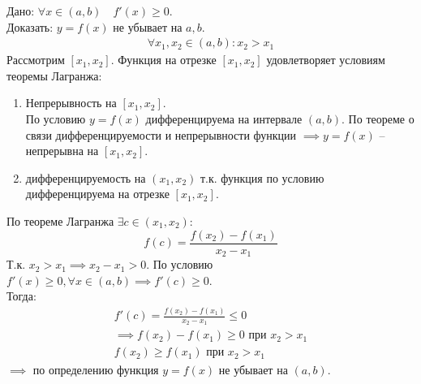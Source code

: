 \begin{sufficiency}
    Дано: $\forall x \in (a, b) \quad f'(x) \ge 0$. \\
    Доказать: $y = f(x)$ не убывает на  $a, b$.
    \begin{gather*}
        \forall x_1, x_2 \in (a,b) : x_2 > x_1
    \end{gather*}
    Рассмотрим $[x_1, x_2]$. Функция на отрезке $[x_1, x_2]$ удовлетворяет условиям теоремы Лагранжа:
    \begin{enumerate}
        \item Непрерывность на $[x_1, x_2]$. \\
        По условию $y = f(x)$ дифференцируема на интервале  $(a, b)$. По теореме о связи дифференцируемости и непрерывности функции  $\implies y=f(x)$ -- непрерывна на $[x_1, x_2]$.
        \item дифференцируемость на $(x_1, x_2)$ т.к. функция по условию дифференцируема на отрезке $[x_1, x_2]$.
    \end{enumerate}
    По теореме Лагранжа $\exists c \in (x_1, x_2)$: \[
        f(c) = \frac{f(x_2) - f(x_1)}{x_2 - x_1}
    \] 
    Т.к. $x_2 > x_1 \implies x_2 - x_1 > 0$. По условию $f'(x) \ge  0, \forall x \in (a, b) \implies f'(c) \ge 0$. \\
    Тогда:
    \begin{gather*}
        f'(c) = \frac{f(x_2) - f(x_1)}{x_2 - x_1} \le 0 \\
        \implies f(x_2) - f(x_1) \ge  0 \text{ при } x_2 > x_1 \\
        f(x_2) \ge f(x_1) \text{ при } x_2 > x_1
    \end{gather*}
    $\implies$ по определению функция $y = f(x)$ не убывает на $(a, b)$.
\end{sufficiency}
\pagebreak



